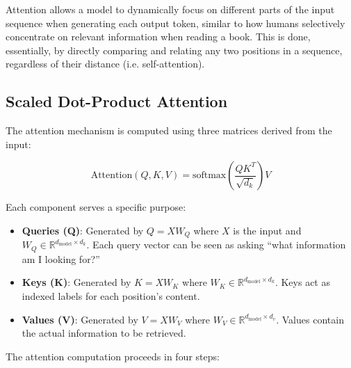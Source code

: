 Attention allows a model to dynamically focus on different parts of the input sequence when generating each output token, similar to how humans selectively concentrate on relevant information when reading a book. This is done, essentially, by directly comparing and relating any two positions in a sequence, regardless of their distance (i.e. self-attention).

\subsection{Scaled Dot-Product Attention}

The attention mechanism is computed using three matrices derived from the input:

\begin{equation}
\text{Attention}(Q, K, V) = \text{softmax}\left(\frac{QK^T}{\sqrt{d_k}}\right)V
\end{equation}

Each component serves a specific purpose:

\begin{itemize}
   \item \textbf{Queries (Q)}: Generated by $Q = XW_Q$ where $X$ is the input and $W_Q \in \mathbb{R}^{d_{\text{model}} \times d_k}$. Each query vector can be seen as asking ``what information am I looking for?''
   \item \textbf{Keys (K)}: Generated by $K = XW_K$ where $W_K \in \mathbb{R}^{d_{\text{model}} \times d_k}$. Keys act as indexed labels for each position's content.
   \item \textbf{Values (V)}: Generated by $V = XW_V$ where $W_V \in \mathbb{R}^{d_{\text{model}} \times d_v}$. Values contain the actual information to be retrieved.
\end{itemize}

The attention computation proceeds in four steps:

